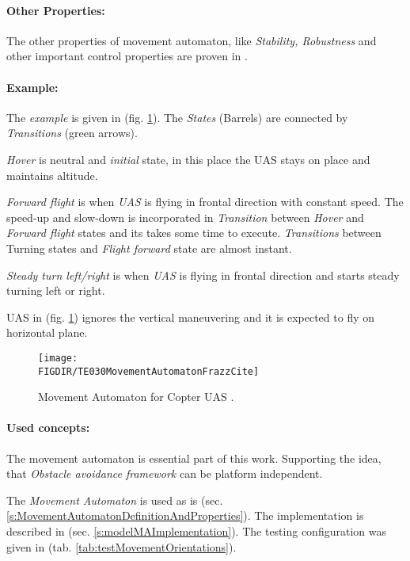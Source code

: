 \paragraph{Other Properties:} The other properties of movement automaton, like \emph{Stability, Robustness} and other important control properties are proven in \cite{frazzoli2001robust}.



\paragraph{Example:} The \emph{example} is given in (fig. \ref{fig:movementAutomatonExampleTheory}). The \emph{States} (Barrels) are connected by \emph{Transitions} (green arrows).

\emph{Hover} is neutral and \emph{initial} state, in this place the UAS stays on place and maintains altitude.

\emph{Forward flight} is when \emph{UAS} is flying in frontal direction with constant speed. The speed-up and slow-down is incorporated in \emph{Transition} between \emph{Hover} and \emph{Forward flight} states and its takes some time to execute. \emph{Transitions} between Turning states and \emph{Flight forward} state are almost instant. 

\emph{Steady turn left/right} is when \emph{UAS} is flying in frontal direction and starts steady turning left or right. 

\begin{note}
UAS in (fig. \ref{fig:movementAutomatonExampleTheory}) ignores the vertical maneuvering and it is expected to fly on horizontal plane.
\end{note}


\begin{figure}[H]
    \centering
    \texttt{[image: \\FIGDIR/TE030MovementAutomatonFrazzCite]} 
    \caption{Movement Automaton for Copter UAS \cite{frazzoli2001robust}.}
    \label{fig:movementAutomatonExampleTheory}
\end{figure}

\paragraph{Used concepts:} The movement automaton is essential part of this work. Supporting the idea, that \emph{Obstacle avoidance framework} can be platform independent. 

The \emph{Movement Automaton} is used as is (sec. \ref{s:MovementAutomatonDefinitionAndProperties}). The implementation is described in (sec. \ref{s:modelMAImplementation}). The testing configuration was given in (tab. \ref{tab:testMovementOrientations}).


